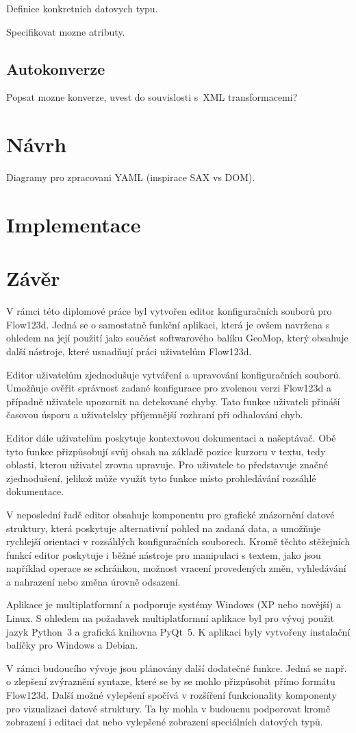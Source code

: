 \documentclass[FM,DP]{tulthesis}
\begin{document}
Definice konkretnich datovych typu.

Specifikovat mozne atributy.

\section{Autokonverze}
Popsat mozne konverze, uvest do souvislosti s~XML transformacemi?


\chapter{Návrh}
Diagramy pro zpracovani YAML (inspirace SAX vs DOM).




\chapter{Implementace}


\chapter*{Závěr}
V rámci této diplomové práce byl vytvořen editor konfiguračních souborů pro Flow123d. Jedná se o samostatně funkční aplikaci, která je ovšem navržena s ohledem na její použití jako součást softwarového balíku GeoMop, který obsahuje další nástroje, které usnadňují práci uživatelům Flow123d.

Editor uživatelům zjednodušuje vytváření a upravování konfiguračních souborů. Umožňuje ověřit správnost zadané konfigurace pro zvolenou verzi Flow123d a případně uživatele upozornit na detekované chyby. Tato funkce uživateli přináší časovou úsporu a uživatelsky příjemnější rozhraní při odhalování chyb.

Editor dále uživatelům poskytuje kontextovou dokumentaci a našeptávač. Obě tyto funkce přizpůsobují svůj obsah na základě pozice kurzoru v textu, tedy oblasti, kterou uživatel zrovna upravuje. Pro uživatele to představuje značné zjednodušení, jelikož může využít tyto funkce místo prohledávání rozsáhlé dokumentace.

V neposlední řadě editor obsahuje komponentu pro grafické znázornění datové struktury, která poskytuje alternativní pohled na zadaná data, a umožňuje rychlejší orientaci v rozsáhlých konfiguračních souborech. Kromě těchto stěžejních funkcí editor poskytuje i běžné nástroje pro manipulaci s textem, jako jsou například operace se schránkou, možnost vracení provedených změn, vyhledávání a nahrazení nebo změna úrovně odsazení.

Aplikace je multiplatformní a podporuje systémy Windows (XP nebo novější) a Linux. S ohledem na požadavek multiplatformní aplikace byl pro vývoj použit jazyk Python~3 a grafická knihovna PyQt~5. K aplikaci byly vytvořeny instalační balíčky pro Windows a Debian.

V rámci budoucího vývoje jsou plánovány další dodatečné funkce. Jedná se např. o zlepšení zvýraznění syntaxe, které se by se mohlo přizpůsobit přímo formátu Flow123d. Další možné vylepšení spočívá v rozšíření funkcionality komponenty pro vizualizaci datové struktury. Ta by mohla v budoucnu podporovat kromě zobrazení i editaci dat nebo vylepšené zobrazení speciálních datových typů.
\end{document}
